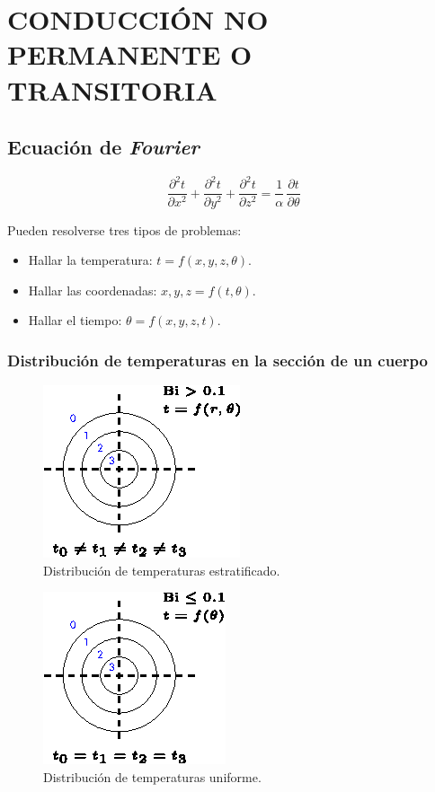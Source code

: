 \chapter{CONDUCCIÓN NO PERMANENTE O TRANSITORIA}

\section{Ecuación de \emph{Fourier}}
\begin{equation}
    \frac{\partial^{2}t}{\partial x^2}
    +\frac{\partial^{2}t}{\partial y^2}
    +\frac{\partial^{2}t}{\partial z^2}
    =\frac{1}{\alpha}\,\frac{\partial t}{\partial\theta}
    \label{fourier}
\end{equation}

Pueden resolverse tres tipos de problemas:

\begin{itemize}
    \item Hallar la temperatura: $t=f(x,y,z,\theta)$.
    \item Hallar las coordenadas: $x,y,z=f(t,\theta)$.
    \item Hallar el tiempo: $\theta=f(x,y,z,t)$.
\end{itemize}

\subsection{Distribución de temperaturas en la sección de un cuerpo}

\begin{figure}[!h]
\centering
\includegraphics[scale=1.75]{figura03_01.eps}
\caption{Distribución de temperaturas estratificado.}
\end{figure}
\begin{figure}[!h]
\centering
\includegraphics[scale=1.75]{figura03_02.eps}
\caption{Distribución de temperaturas uniforme.}
\end{figure}

